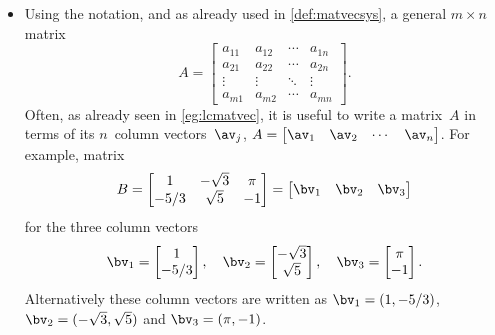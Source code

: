 \begin{itemize}
\item Using the  notation, and as already used in \autoref{def:matvecsys}, a general \(m\times n\) matrix
\begin{equation*}
A=\begin{bmatrix}  a_{11}&a_{12}&\cdots&a_{1n}
\\a_{21}&a_{22}&\cdots&a_{2n}
\\\vdots&\vdots&\ddots&\vdots
\\a_{m1}&a_{m2}&\cdots&a_{mn} \end{bmatrix}.
\end{equation*}
Often, as already seen in \autoref{eg:lcmatvec}, it is useful to write a matrix~\(A\) in terms of its \(n\)~column vectors~\(\av_j\), \(A=\begin{bmatrix} \av_1&\av_2&\cdots&\av_n \end{bmatrix}\).
For example, matrix
\begin{equation*}
B=\begin{bmatrix}   1 & -\sqrt3 & \pi
\\ -5/3 & \sqrt5 & -1 \end{bmatrix}
=\begin{bmatrix} \bv_1&\bv_2&\bv_3 \end{bmatrix}
\end{equation*}
for the three column vectors
\begin{equation*}
\bv_1=\begin{bmatrix}   1 \\ -5/3 \end{bmatrix},\quad
\bv_2=\begin{bmatrix} -\sqrt3 \\ \sqrt5 \end{bmatrix},\quad
\bv_3=\begin{bmatrix} \pi \\ -1 \end{bmatrix}.
\end{equation*}
Alternatively these column vectors are written as 
\(\bv_1=(  1,-5/3)\),
\(\bv_2=(-\sqrt3,\sqrt5)\) and
\(\bv_3=(\pi,-1)\).




\end{itemize}
